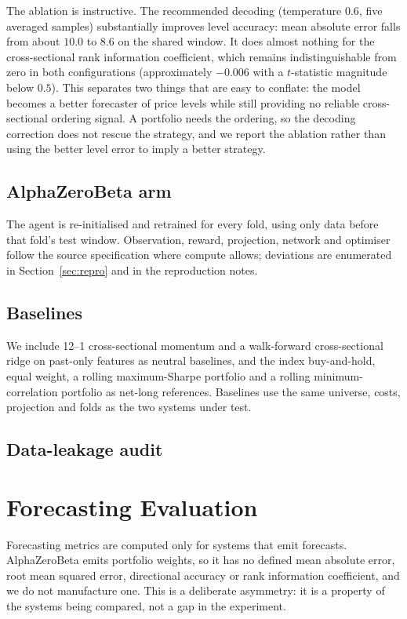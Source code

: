 \documentclass[conference]{IEEEtran}
\newcommand{\tabdir}{tables}
\begin{document}
The ablation is instructive. The recommended decoding (temperature $0.6$, five
averaged samples) substantially improves level accuracy: mean absolute error
falls from about $10.0$ to $8.6$ on the shared window. It does almost nothing
for the cross-sectional rank information coefficient, which remains
indistinguishable from zero in both configurations (approximately $-0.006$ with
a $t$-statistic magnitude below $0.5$). This separates two things that are easy
to conflate: the model becomes a better forecaster of price levels while still
providing no reliable cross-sectional ordering signal. A portfolio needs the
ordering, so the decoding correction does not rescue the strategy, and we report
the ablation rather than using the better level error to imply a better
strategy.

\subsection{AlphaZeroBeta arm}
The agent is re-initialised and retrained for every fold, using only data
before that fold's test window. Observation, reward, projection, network and
optimiser follow the source specification where compute allows; deviations are
enumerated in Section~\ref{sec:repro} and in the reproduction notes.

\subsection{Baselines}
We include 12--1 cross-sectional momentum and a walk-forward cross-sectional
ridge on past-only features as neutral baselines, and the index buy-and-hold,
equal weight, a rolling maximum-Sharpe portfolio and a rolling
minimum-correlation portfolio as net-long references. Baselines use the same
universe, costs, projection and folds as the two systems under test.

\subsection{Data-leakage audit}


\section{Forecasting Evaluation}
\label{sec:forecast}


Forecasting metrics are computed only for systems that emit forecasts.
AlphaZeroBeta emits portfolio weights, so it has no defined mean absolute
error, root mean squared error, directional accuracy or rank information
coefficient, and we do not manufacture one. This is a deliberate asymmetry:
it is a property of the systems being compared, not a gap in the experiment.
\end{document}
